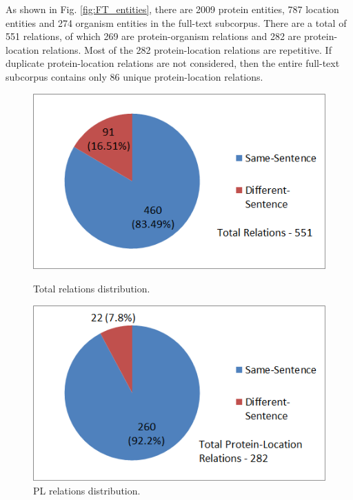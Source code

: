 As shown in Fig. \ref{fig:FT_entities}, there are 2009 protein entities, 787 location entities and 274 organism entities in the full-text subcorpus. There are a total of 551 relations, of which 269 are protein-organism relations and 282 are protein-location relations. Most of the 282 protein-location relations are repetitive. If duplicate protein-location relations are not considered, then the entire full-text subcorpus contains only 86 unique protein-location relations.

\begin{figure}
\centering
\begin{minipage}{.5\textwidth}
  \centering
  \includegraphics[width=.95\textwidth]{figures/2_FTTotalRelDist.png}
  \caption{Total relations distribution.}
  \label{fig:FT_RelDist}
\end{minipage}%
\begin{minipage}{.5\textwidth}
  \centering
  \includegraphics[width=.95\textwidth]{figures/2_FTPLRelDist.png}
  \caption{PL relations distribution.}
  \label{fig:FT_PLRelDist}
\end{minipage}
\end{figure}

